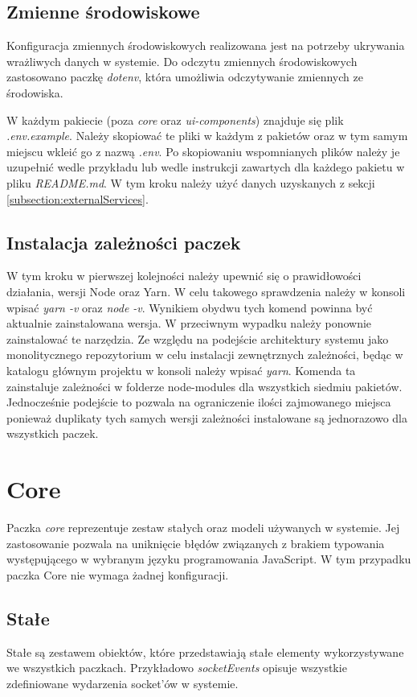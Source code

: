 \label{subsection:envs}
\subsection{Zmienne środowiskowe}
Konfiguracja zmiennych środowiskowych realizowana jest na potrzeby ukrywania wrażliwych danych w systemie.
Do odczytu zmiennych środowiskowych zastosowano paczkę \textit{dotenv}, która umożliwia odczytywanie zmiennych ze środowiska.

W każdym pakiecie (poza \textit{core} oraz \textit{ui-components}) znajduje się plik \textit{.env.example}. Należy skopiować te pliki w każdym z pakietów oraz w tym samym miejscu wkleić go z nazwą \textit{.env}. Po skopiowaniu wspomnianych plików należy je uzupełnić wedle przykładu lub wedle instrukcji zawartych dla każdego pakietu w pliku \textit{README.md}. W tym kroku należy użyć danych uzyskanych z sekcji \ref{subsection:externalServices}.

\subsection{Instalacja zależności paczek}
W tym kroku w pierwszej kolejności należy upewnić się o prawidłowości działania, wersji Node oraz Yarn. W celu takowego sprawdzenia należy w konsoli wpisać \textit{yarn -v} oraz \textit{node -v}. Wynikiem obydwu tych komend powinna być aktualnie zainstalowana wersja. W przeciwnym wypadku należy ponownie zainstalować te narzędzia.
Ze względu na podejście architektury systemu jako monolitycznego repozytorium w celu instalacji zewnętrznych zależności, będąc w katalogu głównym projektu w konsoli należy wpisać \textit{yarn}. Komenda ta zainstaluje zależności w folderze node-modules dla wszystkich siedmiu pakietów. Jednocześnie podejście to pozwala na ograniczenie ilości zajmowanego miejsca ponieważ duplikaty tych samych wersji zależności instalowane są jednorazowo dla wszystkich paczek.

\section{Core}
Paczka \textit{core} reprezentuje zestaw stałych oraz modeli używanych w systemie. Jej zastosowanie pozwala na uniknięcie błędów związanych z brakiem typowania występującego w wybranym języku programowania
JavaScript. W tym przypadku paczka Core nie wymaga żadnej konfiguracji.

\subsection{Stałe}
Stałe są zestawem obiektów, które przedstawiają stałe elementy wykorzystywane we wszystkich paczkach. Przykładowo \textit{socketEvents} opisuje wszystkie zdefiniowane wydarzenia socket'ów w systemie.

